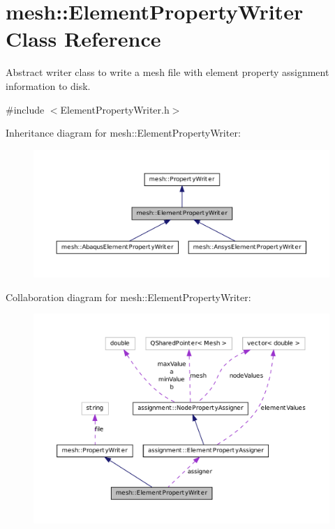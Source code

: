 \hypertarget{classmesh_1_1_element_property_writer}{
\section{mesh::ElementPropertyWriter Class Reference}
\label{classmesh_1_1_element_property_writer}
}


Abstract writer class to write a mesh file with element property assignment information to disk.  




{\ttfamily \#include $<$ElementPropertyWriter.h$>$}



Inheritance diagram for mesh::ElementPropertyWriter:\nopagebreak
\begin{figure}[H]
\begin{center}
\leavevmode
\includegraphics[width=400pt]{classmesh_1_1_element_property_writer__inherit__graph}
\end{center}
\end{figure}


Collaboration diagram for mesh::ElementPropertyWriter:\nopagebreak
\begin{figure}[H]
\begin{center}
\leavevmode
\includegraphics[width=400pt]{classmesh_1_1_element_property_writer__coll__graph}
\end{center}
\end{figure}
